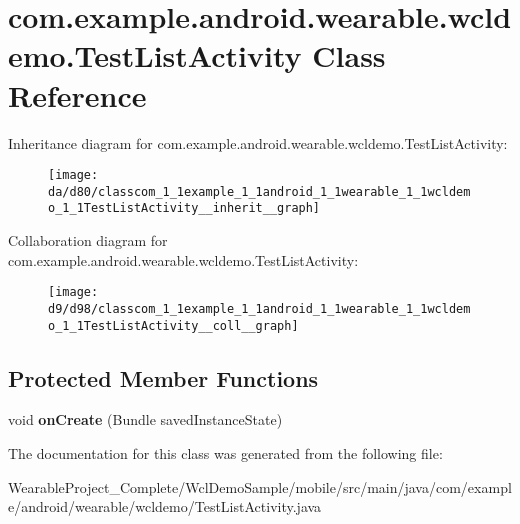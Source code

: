 \hypertarget{classcom_1_1example_1_1android_1_1wearable_1_1wcldemo_1_1TestListActivity}{}\section{com.\+example.\+android.\+wearable.\+wcldemo.\+Test\+List\+Activity Class Reference}
\label{classcom_1_1example_1_1android_1_1wearable_1_1wcldemo_1_1TestListActivity}


Inheritance diagram for com.\+example.\+android.\+wearable.\+wcldemo.\+Test\+List\+Activity\+:\nopagebreak
\begin{figure}[H]
\begin{center}
\leavevmode
\texttt{[image: da/d80/classcom\_1\_1example\_1\_1android\_1\_1wearable\_1\_1wcldemo\_1\_1TestListActivity\_\_inherit\_\_graph]}
\end{center}
\end{figure}


Collaboration diagram for com.\+example.\+android.\+wearable.\+wcldemo.\+Test\+List\+Activity\+:\nopagebreak
\begin{figure}[H]
\begin{center}
\leavevmode
\texttt{[image: d9/d98/classcom\_1\_1example\_1\_1android\_1\_1wearable\_1\_1wcldemo\_1\_1TestListActivity\_\_coll\_\_graph]}
\end{center}
\end{figure}
\subsection*{Protected Member Functions}
\begin{DoxyCompactItemize}
\item 
void {\bfseries on\+Create} (Bundle saved\+Instance\+State)\hypertarget{classcom_1_1example_1_1android_1_1wearable_1_1wcldemo_1_1TestListActivity_af6fb4f4e2083b823b482ee3ebf94444d}{}\label{classcom_1_1example_1_1android_1_1wearable_1_1wcldemo_1_1TestListActivity_af6fb4f4e2083b823b482ee3ebf94444d}

\end{DoxyCompactItemize}


The documentation for this class was generated from the following file\+:\begin{DoxyCompactItemize}
\item 
Wearable\+Project\+\_\+\+Complete/\+Wcl\+Demo\+Sample/mobile/src/main/java/com/example/android/wearable/wcldemo/Test\+List\+Activity.\+java\end{DoxyCompactItemize}
